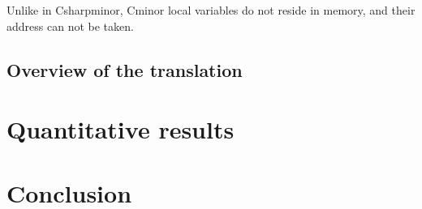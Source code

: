 \documentclass[namedreferences]{kluwer}
\begin{document}
\begin{article}
Unlike in Csharpminor, Cminor local variables do not reside in memory, 
and their address can not be taken.

\subsection{Overview of the translation}

\section{Quantitative results}

\section{Conclusion}




\end{article}
\end{document}
